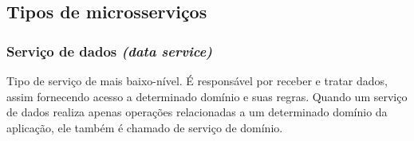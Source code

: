 
\subsection{Tipos de microsserviços}\label{fundamentacao-tipos-microsservicos}

\subsubsection{Serviço de dados \emph{(data service)}}
Tipo de serviço de mais baixo-nível. É responsável por receber e tratar dados, assim fornecendo acesso a determinado domínio e suas regras. Quando um serviço de dados realiza apenas operações relacionadas a um determinado domínio da aplicação, ele também é chamado de serviço de domínio.

